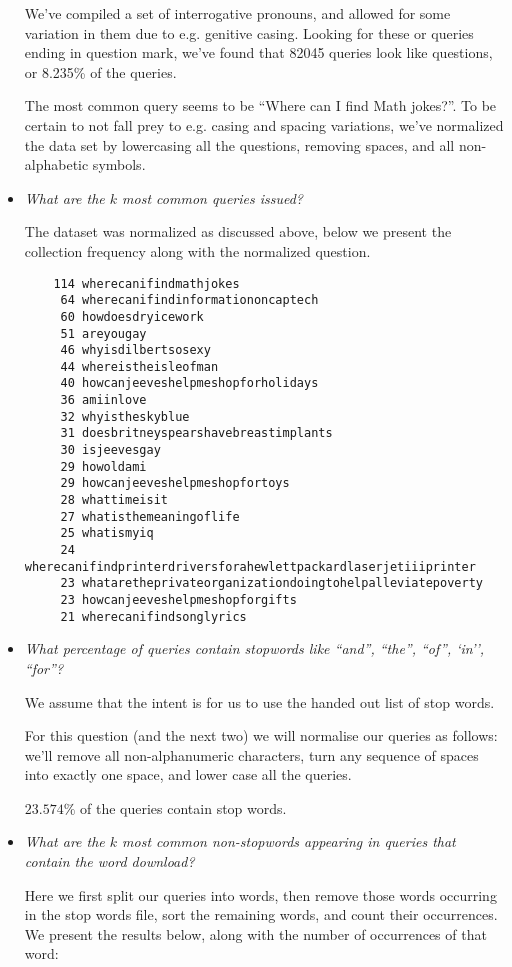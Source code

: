 \begin{itemize}
We've compiled a set of interrogative pronouns, and allowed for some variation
in them due to e.g. genitive casing. Looking for these or queries ending in
question mark, we've found that 82045 queries look like questions, or 8.235\%
of the queries.

The most common query seems to be ``Where can I find Math jokes?''. To be
certain to not fall prey to e.g. casing and spacing variations, we've
normalized the data set by lowercasing all the questions, removing spaces, and
all non-alphabetic symbols.

\item \emph{What are the $k$ most common queries issued?}

The dataset was normalized as discussed above, below we present the collection
frequency along with the normalized question.

\begin{lstlisting}
    114 wherecanifindmathjokes
     64 wherecanifindinformationoncaptech
     60 howdoesdryicework
     51 areyougay
     46 whyisdilbertsosexy
     44 whereistheisleofman
     40 howcanjeeveshelpmeshopforholidays
     36 amiinlove
     32 whyistheskyblue
     31 doesbritneyspearshavebreastimplants
     30 isjeevesgay
     29 howoldami
     29 howcanjeeveshelpmeshopfortoys
     28 whattimeisit
     27 whatisthemeaningoflife
     25 whatismyiq
     24 wherecanifindprinterdriversforahewlettpackardlaserjetiiiprinter
     23 whataretheprivateorganizationdoingtohelpalleviatepoverty
     23 howcanjeeveshelpmeshopforgifts
     21 wherecanifindsonglyrics
\end{lstlisting}

\item \emph{What percentage of queries contain stopwords like ``and'', ``the'',
``of'', `in'', ``for''?}

We assume that the intent is for us to use the handed out list of stop words.

For this question (and the next two) we will normalise our queries as follows:
we'll remove all non-alphanumeric characters, turn any sequence of spaces into
exactly one space, and lower case all the queries.

$23.574\%$ of the queries contain stop words.

\item \emph{What are the $k$ most common non-stopwords appearing in queries
that contain the word download?}

Here we first split our queries into words, then remove those words occurring
in the stop words file, sort the remaining words, and count their occurrences.
We present the results below, along with the number of occurrences of that
word:


\end{itemize}
